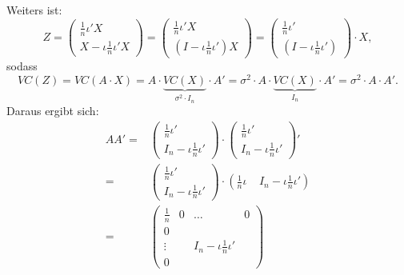 \documentclass[10pt]{article}
\newenvironment{BSP}[1][]
{\begin{Beispiel}[frametitle=#1]}{\end{Beispiel}}
\begin{document}
\begin{BSP}[Beispiel 3.0.1 (komponentenweise Unkorreliertheit)]
				Weiters ist:
				\begin{equation*}
					Z = \left(
					\begin{array}{c}
						\frac{1}{n} \iota' X\\
						X - \iota \frac{1}{n} \iota' X
					\end{array}
					\right) = \left(
					\begin{array}{c}
						\frac{1}{n} \iota' X\\
						(I - \iota \frac{1}{n} \iota') X
					\end{array}
					\right) =  \left(
					\begin{array}{c}
						\frac{1}{n} \iota'\\
						(I - \iota \frac{1}{n} \iota')
					\end{array}
					\right) \cdot X, 						
				\end{equation*}
				sodass
				\begin{equation*}
					VC(Z) = VC(A \cdot X) = A \cdot \underbrace{VC(X)}_{\sigma^2 \cdot I_n} \cdot A' = \sigma^2 \cdot A \cdot \underbrace{VC(X)}_{I_n} \cdot A' = \sigma^2 \cdot A \cdot A'.
				\end{equation*}
				Daraus ergibt sich:
				\begin{equation*}
					\begin{split}
						AA' =&  \left(
						\begin{array}{c}
							\frac{1}{n} \iota'\\
							I_n - \iota \frac{1}{n} \iota'
						\end{array}
						\right) \cdot  \left(
						\begin{array}{c}
							\frac{1}{n} \iota'\\
							I_n - \iota \frac{1}{n} \iota'
						\end{array}
						\right)'\\
						=&  \left(
						\begin{array}{c}
							\frac{1}{n} \iota'\\
							I_n - \iota \frac{1}{n} \iota'
						\end{array}
						\right) \cdot  \left( \frac{1}{n} \iota \; \; \; \; I_n - \iota \frac{1}{n} \iota'\right)\\
						=& \begin{pmatrix}
							\frac{1}{n} & 0 & \ldots &  0\\
							0 &  &  &\\
							\vdots &  & I_n - \iota \frac{1}{n} \iota' &\\
							0 & & & 

\end{pmatrix}
\end{split}
\end{equation*}
\end{BSP}
\end{document}
